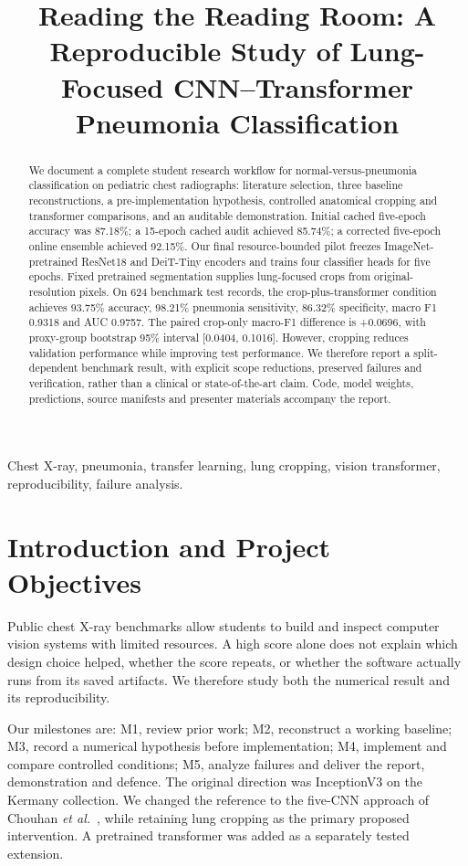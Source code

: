 \documentclass[conference]{IEEEtran}
\title{Reading the Reading Room: A Reproducible Study of Lung-Focused CNN--Transformer Pneumonia Classification}
\author{\IEEEauthorblockN{Samarth Shekhar}\IEEEauthorblockA{230042\\Computer Vision Project}\and\IEEEauthorblockN{Meghavi Rao}\IEEEauthorblockA{230044\\Computer Vision Project}\and\IEEEauthorblockN{Rachit Kumar}\IEEEauthorblockA{230128\\Computer Vision Project}\and\IEEEauthorblockN{Harshal Nerpagar}\IEEEauthorblockA{230076\\Computer Vision Project}}
\begin{document}
\maketitle
\begin{abstract}
We document a complete student research workflow for normal-versus-pneumonia classification on pediatric chest radiographs: literature selection, three baseline reconstructions, a pre-implementation hypothesis, controlled anatomical cropping and transformer comparisons, and an auditable demonstration. Initial cached five-epoch accuracy was 87.18\%; a 15-epoch cached audit achieved 85.74\%; a corrected five-epoch online ensemble achieved 92.15\%. Our final resource-bounded pilot freezes ImageNet-pretrained ResNet18 and DeiT-Tiny encoders and trains four classifier heads for five epochs. Fixed pretrained segmentation supplies lung-focused crops from original-resolution pixels. On 624 benchmark test records, the crop-plus-transformer condition achieves 93.75\% accuracy, 98.21\% pneumonia sensitivity, 86.32\% specificity, macro F1 0.9318 and AUC 0.9757. The paired crop-only macro-F1 difference is +0.0696, with proxy-group bootstrap 95\% interval [0.0404, 0.1016]. However, cropping reduces validation performance while improving test performance. We therefore report a split-dependent benchmark result, with explicit scope reductions, preserved failures and verification, rather than a clinical or state-of-the-art claim. Code, model weights, predictions, source manifests and presenter materials accompany the report.
\end{abstract}
\begin{IEEEkeywords}Chest X-ray, pneumonia, transfer learning, lung cropping, vision transformer, reproducibility, failure analysis.\end{IEEEkeywords}

\section{Introduction and Project Objectives}
Public chest X-ray benchmarks allow students to build and inspect computer vision systems with limited resources. A high score alone does not explain which design choice helped, whether the score repeats, or whether the software actually runs from its saved artifacts. We therefore study both the numerical result and its reproducibility.

Our milestones are: M1, review prior work; M2, reconstruct a working baseline; M3, record a numerical hypothesis before implementation; M4, implement and compare controlled conditions; M5, analyze failures and deliver the report, demonstration and defence. The original direction was InceptionV3 on the Kermany collection. We changed the reference to the five-CNN approach of Chouhan \emph{et al.}~\cite{chouhan}, while retaining lung cropping as the primary proposed intervention. A pretrained transformer was added as a separately tested extension.
\end{document}
